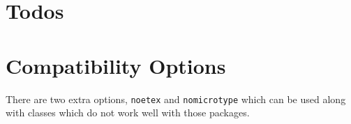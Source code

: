 \documentclass{scrartcl}
\begin{document}
\section{Todos}



\section{Compatibility Options}

There are two extra options, \verb|noetex| and \verb|nomicrotype| which can be used along with classes which do not work well with those packages.
\end{document}
